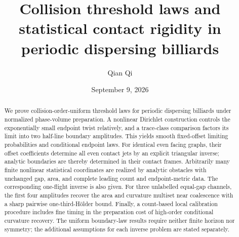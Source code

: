 
\title[Collision laws and statistical contact rigidity]{Collision threshold laws and statistical contact rigidity
in periodic dispersing billiards}
\author{Qian Qi}
\date{September 9, 2026}

\begin{abstract}
We prove collision-order-uniform threshold laws for periodic dispersing
billiards under normalized phase-volume preparation. A nonlinear
Dirichlet construction controls the exponentially small endpoint twist
relatively, and a trace-class comparison factors its limit into two
half-line boundary amplitudes. This yields smooth fixed-offset limiting
probabilities and conditional endpoint laws. For identical even facing
graphs, their offset coefficients determine all even contact jets by an
explicit triangular inverse; analytic boundaries are thereby determined
in their contact frames. Arbitrarily many finite nonlinear statistical
coordinates are realized by analytic obstacles with unchanged gap, area,
and complete leading count and endpoint-metric data. The corresponding
one-flight inverse is also given. For three unlabelled equal-gap channels,
the first four amplitudes recover the area and curvature multiset near
coalescence with a sharp pairwise one-third-H\"older bound. Finally, a
count-based local calibration procedure includes fine timing in the
preparation cost of high-order conditional curvature recovery. The
uniform boundary-law results require neither finite horizon nor symmetry;
the additional assumptions for each inverse problem are stated separately.
\end{abstract}
\maketitle















\appendix









